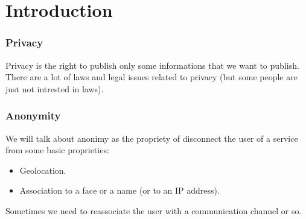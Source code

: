\section{Introduction}

\begin{frame}
	\frametitle {Privacy}
	Privacy is the right to publish only some informations that we want to
	publish.\\

	There are a lot of laws and legal issues related to privacy (but some
	people are just not intrested in laws).
\end{frame}

\begin{frame}
	\frametitle {Anonymity}
	We will talk about anonimy as the propriety of disconnect the user of a
	service from some basic proprieties:
	\begin{itemize}
		\item Geolocation.
		\item Association to a face or a name (or to an IP address).
	\end{itemize}

	Sometimes we need to reassociate the user with a communication
	channel or so.
\end{frame}
